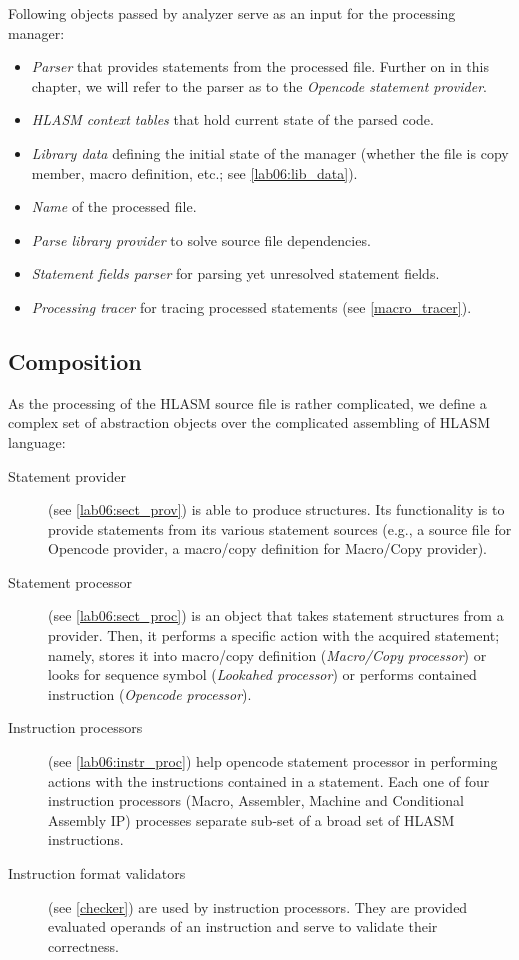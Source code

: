 Following objects passed by analyzer serve as an input for the processing manager:
\begin{itemize}
	\item \emph{Parser} that provides statements from the processed file. Further on in this chapter, we will refer to the parser as to the \emph{Opencode statement provider}.
	\item \emph{HLASM context tables} that hold current state of the parsed code.
	\item \emph{Library data} defining the initial state of the manager (whether the file is copy member, macro definition, etc.; see \cref{lab06:lib_data}). 
	\item \emph{Name} of the processed file.
	\item \emph{Parse library provider} to solve source file dependencies.
	\item \emph{Statement fields parser} for parsing yet unresolved statement fields. 
	\item \emph{Processing tracer} for tracing processed statements (see \cref{macro_tracer}).
\end{itemize}


\subsection{Composition}

As the processing of the HLASM source file is rather complicated, we define a complex set of abstraction objects over the complicated assembling of HLASM language:

\begin{description}
	\item[Statement provider] (see \cref{lab06:sect_prov}) is able to produce  structures. Its functionality is to provide statements from its various statement sources (e.g., a source file for Opencode provider, a macro/copy definition for Macro/Copy provider).
	
	\item[Statement processor] (see \cref{lab06:sect_proc}) is an object that takes statement structures from a provider. Then, it performs a specific action with the acquired statement; namely, stores it into macro/copy definition (\emph{Macro/Copy processor}) or looks for sequence symbol (\emph{Lookahed processor}) or performs contained instruction (\emph{Opencode processor}).
	
	\item[Instruction processors] (see \cref{lab06:instr_proc}) help opencode statement processor in performing actions with the instructions contained in a statement. Each one of four instruction processors (Macro, Assembler, Machine and Conditional Assembly IP) processes separate sub-set of a broad set of HLASM instructions. 
	
	\item[Instruction format validators] (see \cref{checker}) are used by instruction processors. They are provided evaluated operands of an instruction and serve to validate their correctness. 
	
\end{description}

